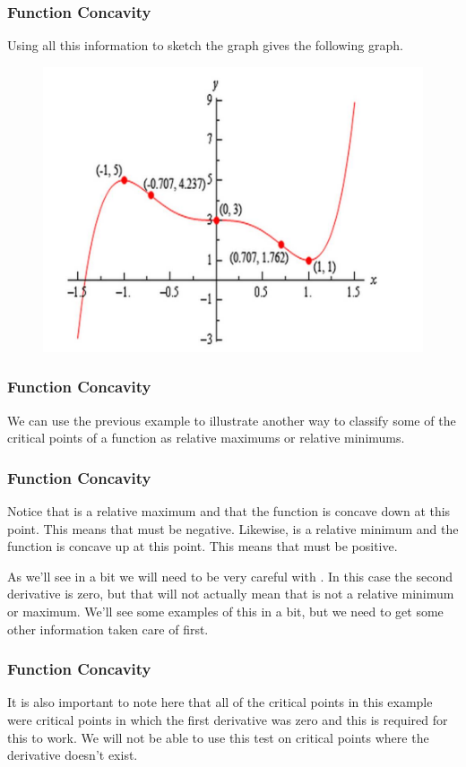 \documentclass{beamer}
\begin{document}
\begin{frame} 
	\frametitle{Function Concavity}
 Using all this information to sketch the graph gives the following graph.
\begin{figure}
\centering
\includegraphics[width=0.79\linewidth]{CurveSketchingGraphs1/Slide9}

\end{figure}
\end{frame}
\begin{frame} 
	\frametitle{Function Concavity}
 
 We can use the previous example to illustrate another way to classify some of the critical points of a function as relative maximums or relative minimums.
\end{frame}
\begin{frame} 
	\frametitle{Function Concavity} 
 Notice that  is a relative maximum and that the function is concave down at this point. This means that  must be negative.  Likewise,  is a relative minimum and the function is concave up at this point.  This means that  must be positive. 
 
 As we’ll see in a bit we will need to be very careful with .  In this case the second derivative is zero, but that will not actually mean that  is not a relative minimum or maximum.  We’ll see some examples of this in a bit, but we need to get some other information taken care of first.
\end{frame}
\begin{frame} 
	\frametitle{Function Concavity} 
 It is also important to note here that all of the critical points in this example were critical points in which the first derivative was zero and this is required for this to work.  We will not be able to use this test on critical points where the derivative doesn’t exist.
\end{frame}
\end{document}
